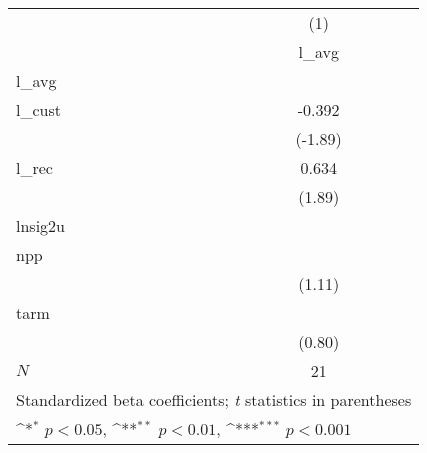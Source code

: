 {
\def\sym#1{\ifmmode^{#1}\else\(^{#1}\)\fi}
\begin{tabular}{l*{1}{c}}
\hline\hline
            &\multicolumn{1}{c}{(1)}\\
            &\multicolumn{1}{c}{l\_avg}\\
\hline
l\_avg       &                     \\
l\_cust      &      -0.392         \\
            &     (-1.89)         \\
[1em]
l\_rec       &       0.634         \\
            &      (1.89)         \\
\hline
lnsig2u     &                     \\
npp         &                     \\
            &      (1.11)         \\
[1em]
tarm        &                     \\
            &      (0.80)         \\
\hline
\(N\)       &          21         \\
\hline\hline
\multicolumn{2}{l}{\footnotesize Standardized beta coefficients; \textit{t} statistics in parentheses}\\
\multicolumn{2}{l}{\footnotesize \sym{*} \(p<0.05\), \sym{**} \(p<0.01\), \sym{***} \(p<0.001\)}\\
\end{tabular}
}
